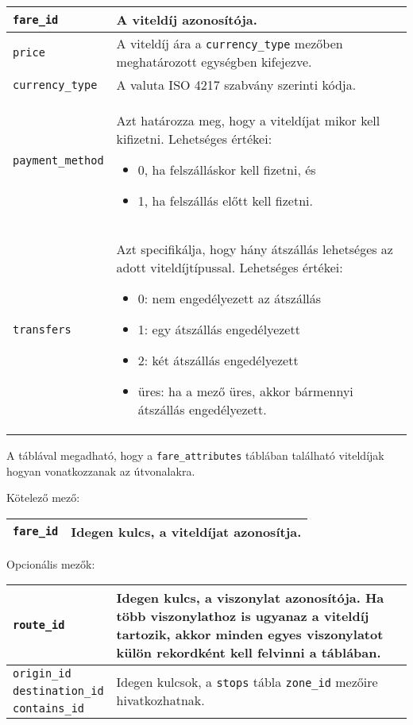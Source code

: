 \begin{tabular}{|p{3.5cm}|p{10cm}|}
\hline
\texttt{fare\_id} & A viteldíj azonosítója. \\
\hline
\texttt{price} & A viteldíj ára a \texttt{currency\_type} mezőben meghatározott egységben kifejezve. \\
\hline
\texttt{currency\_type} & A valuta ISO 4217 szabvány szerinti kódja. \\
\hline
\texttt{payment\_method} & Azt határozza meg, hogy a viteldíjat mikor kell kifizetni.
Lehetséges értékei:
\begin{itemize}
\item 0, ha felszálláskor kell fizetni, és
\item 1, ha felszállás előtt kell fizetni.
\end{itemize}
\\
\hline
\texttt{transfers} & Azt specifikálja, hogy hány átszállás lehetséges az adott viteldíjtípussal.
Lehetséges értékei:
\begin{itemize}
\item 0: nem engedélyezett az átszállás
\item 1: egy átszállás engedélyezett
\item 2: két átszállás engedélyezett
\item üres: ha a mező üres, akkor bármennyi átszállás engedélyezett.
\end{itemize}
\\
\hline
\end{tabular}


A táblával megadható, hogy a \texttt{fare\_attributes} táblában található viteldíjak hogyan vonatkozzanak az útvonalakra.

\medskip

\noindent Kötelező mező:

\bigskip

\begin{tabular}{|p{3cm}|p{10cm}|}
\hline
\texttt{fare\_id} & Idegen kulcs, a viteldíjat azonosítja. \\
\hline
\end{tabular}

\bigskip

\noindent Opcionális mezők:

\bigskip



\begin{tabular}{|p{3cm}|p{10cm}|}
\hline
\texttt{route\_id} & Idegen kulcs, a viszonylat azonosítója. Ha több viszonylathoz is ugyanaz a viteldíj tartozik, akkor minden egyes viszonylatot külön rekordként kell felvinni a táblában. \\
\hline
\texttt{origin\_id} & \multirow{3}{10cm}{Idegen kulcsok, a \texttt{stops} tábla \texttt{zone\_id} mezőire hivatkozhatnak.} \\
\cline{1-1}
\texttt{destination\_id} & \\
\cline{1-1}
\texttt{contains\_id} & \\
\hline
\end{tabular}


